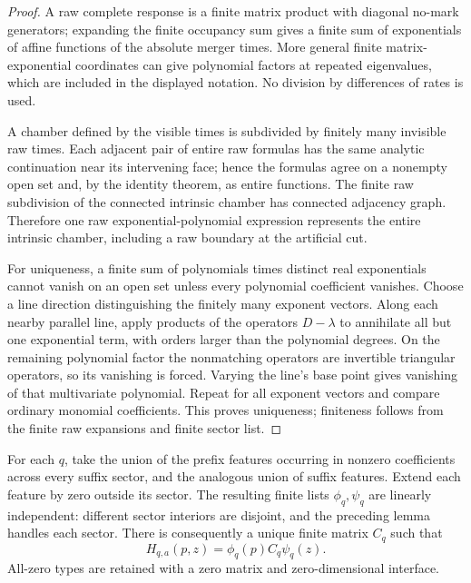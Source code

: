 \documentclass[11pt]{article}
\begin{document}
\begin{proof}
A raw complete response is a finite matrix product with diagonal no-mark generators; expanding the finite occupancy sum gives a finite sum of exponentials of affine functions of the absolute merger times.  More general finite matrix-exponential coordinates can give polynomial factors at repeated eigenvalues, which are included in the displayed notation.  No division by differences of rates is used.

A chamber defined by the visible times is subdivided by finitely many invisible raw times.  Each adjacent pair of entire raw formulas has the same analytic continuation near its intervening face; hence the formulas agree on a nonempty open set and, by the identity theorem, as entire functions.  The finite raw subdivision of the connected intrinsic chamber has connected adjacency graph.  Therefore one raw exponential-polynomial expression represents the entire intrinsic chamber, including a raw boundary at the artificial cut.

For uniqueness, a finite sum of polynomials times distinct real exponentials cannot vanish on an open set unless every polynomial coefficient vanishes.  Choose a line direction distinguishing the finitely many exponent vectors.  Along each nearby parallel line, apply products of the operators $D-\lambda$ to annihilate all but one exponential term, with orders larger than the polynomial degrees.  On the remaining polynomial factor the nonmatching operators are invertible triangular operators, so its vanishing is forced.  Varying the line's base point gives vanishing of that multivariate polynomial.  Repeat for all exponent vectors and compare ordinary monomial coefficients.  This proves uniqueness; finiteness follows from the finite raw expansions and finite sector list.
\end{proof}

For each $q$, take the union of the prefix features occurring in nonzero coefficients across every suffix sector, and the analogous union of suffix features.  Extend each feature by zero outside its sector.  The resulting finite lists $\phi_q,\psi_q$ are linearly independent: different sector interiors are disjoint, and the preceding lemma handles each sector.  There is consequently a unique finite matrix $C_q$ such that
\begin{equation}
H_{q,a}(p,z)=\phi_q(p)C_q\psi_q(z).
\label{eq:supp-port-matrix}
\end{equation}
All-zero types are retained with a zero matrix and zero-dimensional interface.
\end{document}
